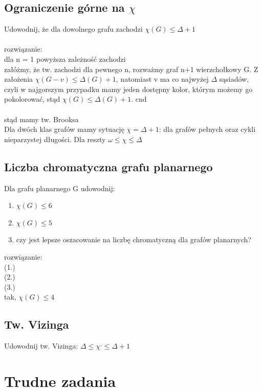 \documentclass{article}
\begin{document}
\subsection*{Ograniczenie górne na $\chi$}
Udowodnij, że dla dowolnego grafu zachodzi $\chi(G) \leq \Delta + 1$ \\\\rozwiązanie:\\
dla n = 1 powyższa zależność zachodzi \\
załóżmy, że tw. zachodzi dla pewnego n, rozważmy graf n+1 wierzchołkowy G.  
Z założenia $\chi(G - v) \leq \Delta(G) + 1$, natomiast v ma co najwyżej $\Delta$ sąsiadów, 
czyli w najgorszym przypadku mamy jeden dostępny kolor, którym możemy go pokolorować, stąd 
$\chi(G)\leq \Delta(G) + 1$. cnd \\\\
stąd mamy tw. Brooksa \\
Dla dwóch klas grafów mamy sytuację $\chi = \Delta + 1$: dla grafów pełnych oraz cykli nieparzystej długości. 
Dla reszty $\omega \leq \chi \leq \Delta$

\subsection*{Liczba chromatyczna grafu planarnego}
Dla grafu planarnego G udowodnij:
\begin{enumerate}
	\item $\chi(G) \leq 6$
	\item $\chi(G) \leq 5$
	\item czy jest lepsze oszacowanie na liczbę chromatyczną dla grafów planarnych?
\end{enumerate}
rozwiązanie: \\
(1.)\\
(2.)\\
(3.)\\
tak, $\chi(G) \leq 4$

\subsection*{Tw. Vizinga}
Udowodnij tw. Vizinga: $\Delta \leq \chi^, \leq \Delta + 1$

\section{Trudne zadania}
\end{document}
